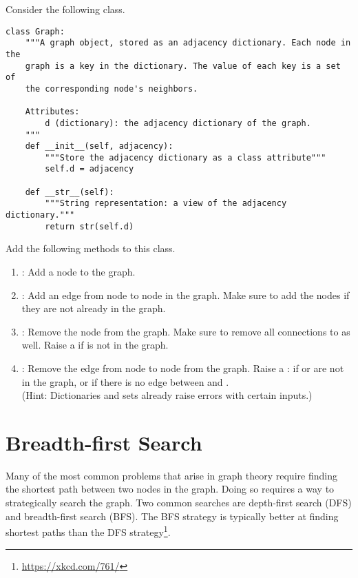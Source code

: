 \begin{problem}
Consider the following  class.
\begin{lstlisting}
class Graph:
    """A graph object, stored as an adjacency dictionary. Each node in the
    graph is a key in the dictionary. The value of each key is a set of
    the corresponding node's neighbors.

    Attributes:
        d (dictionary): the adjacency dictionary of the graph.
    """
    def __init__(self, adjacency):
        """Store the adjacency dictionary as a class attribute"""
        self.d = adjacency

    def __str__(self):
        """String representation: a view of the adjacency dictionary."""
        return str(self.d)
\end{lstlisting}
Add the following methods to this class.
\begin{enumerate}
\item {}: Add a node  to the graph.
\item {}: Add an edge from node  to node  in the graph. Make sure to add the nodes if they are not already in the graph.
\item {}: Remove the node  from the graph. Make sure to remove all connections to  as well.
Raise a  if  is not in the graph.
\item {}: Remove the edge from node  to node  from the graph.
Raise a : if  or  are not in the graph, or if there is no edge between  and .
\\(Hint: Dictionaries and sets already raise errors with certain inputs.)
\end{enumerate}
\end{problem}

\section*{Breadth-first Search}

Many of the most common problems that arise in graph theory require finding the shortest path between two nodes in the graph.
Doing so requires a way to strategically search the graph.
Two common searches are depth-first search (DFS) and breadth-first search (BFS).
The BFS strategy is typically better at finding shortest paths than the DFS strategy\footnote{\url{https://xkcd.com/761/}}.

